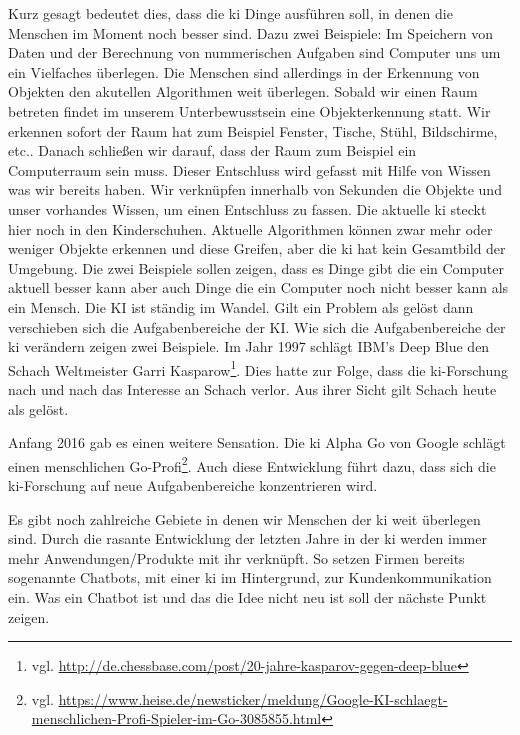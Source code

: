 Kurz gesagt bedeutet dies, dass die \ac{ki} Dinge ausführen soll, in denen die Menschen im Moment noch besser sind. Dazu zwei Beispiele: \newline
Im Speichern von Daten und der Berechnung von nummerischen Aufgaben sind Computer uns um ein Vielfaches überlegen. \newline
 Die Menschen sind allerdings in der Erkennung von Objekten den akutellen Algorithmen weit überlegen. Sobald wir einen Raum betreten findet im unserem Unterbewusstsein eine Objekterkennung statt. Wir erkennen sofort der Raum hat zum Beispiel Fenster, Tische, Stühl, Bildschirme, etc.. Danach schließen wir darauf, dass der Raum zum Beispiel ein Computerraum sein muss. Dieser Entschluss wird gefasst mit Hilfe von Wissen was wir bereits haben. Wir verknüpfen innerhalb von Sekunden die Objekte und unser vorhandes Wissen, um einen Entschluss zu fassen. Die aktuelle \ac{ki} steckt hier noch in den Kinderschuhen. Aktuelle Algorithmen können zwar mehr oder weniger Objekte erkennen und diese Greifen, aber die \ac{ki} hat kein Gesamtbild der Umgebung. Die zwei Beispiele sollen zeigen, dass es Dinge gibt die ein Computer aktuell besser kann aber auch Dinge die ein Computer noch nicht besser kann als ein Mensch. Die KI ist ständig im Wandel. Gilt ein Problem als gelöst dann verschieben sich die Aufgabenbereiche der KI.   
Wie sich die Aufgabenbereiche der \ac{ki} verändern zeigen zwei Beispiele. Im Jahr 1997 schlägt IBM's Deep Blue den Schach Weltmeister Garri Kasparow\footnote{vgl. \url{http://de.chessbase.com/post/20-jahre-kasparov-gegen-deep-blue}}. Dies hatte zur Folge, dass die \ac{ki}-Forschung nach und nach das Interesse an Schach verlor. Aus ihrer Sicht gilt Schach heute als gelöst. 

Anfang 2016 gab es einen weitere Sensation. Die \ac{ki} Alpha Go von Google schlägt einen menschlichen Go-Profi\footnote{vgl. \url{https://www.heise.de/newsticker/meldung/Google-KI-schlaegt-menschlichen-Profi-Spieler-im-Go-3085855.html}}. Auch diese Entwicklung führt dazu, dass sich die \ac{ki}-Forschung auf neue Aufgabenbereiche konzentrieren wird. 

Es gibt noch zahlreiche Gebiete in denen wir Menschen der \ac{ki} weit überlegen sind. Durch die rasante Entwicklung der letzten Jahre in der \ac{ki} werden immer mehr Anwendungen/Produkte mit ihr verknüpft. So setzen Firmen bereits sogenannte Chatbots, mit einer \ac{ki} im Hintergrund, zur Kundenkommunikation ein. Was ein Chatbot ist und das die Idee nicht neu ist soll der nächste Punkt zeigen. 

